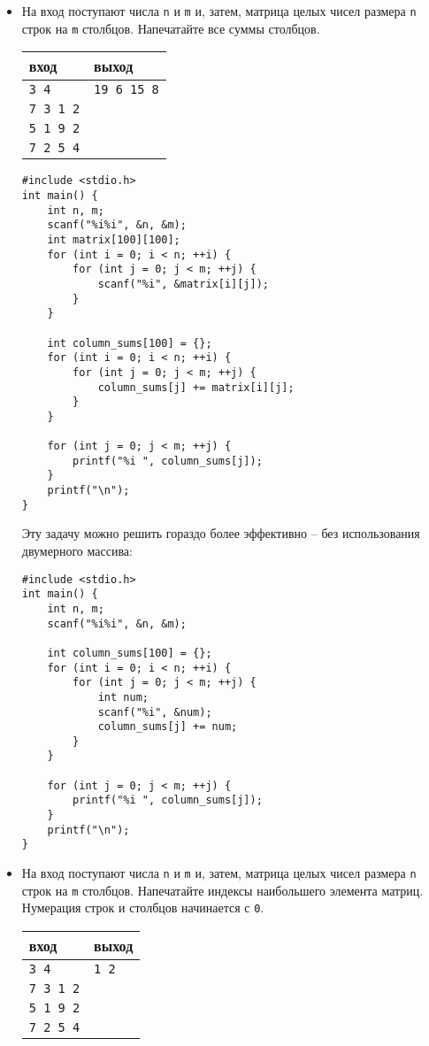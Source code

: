 \documentclass{article}
\begin{document}
\begin{itemize}
\item На вход поступают числа \texttt{n} и \texttt{m} и, затем, матрица целых чисел размера \texttt{n} строк на \texttt{m} столбцов. Напечатайте все суммы столбцов.
\begin{center}
\begin{tabular}{ l | l }
 вход & выход \\ \hline
 \texttt{3 4} & \texttt{19 6 15 8}  \\ 
 \texttt{7 3 1 2} &  \\ 
 \texttt{5 1 9 2} &  \\ 
 \texttt{7 2 5 4} &  \\ 
\end{tabular}
\end{center}

\begin{lstlisting}[backgroundcolor = \color{solcolor}]
#include <stdio.h>
int main() {
    int n, m;
    scanf("%i%i", &n, &m);
    int matrix[100][100];
    for (int i = 0; i < n; ++i) {
        for (int j = 0; j < m; ++j) {
            scanf("%i", &matrix[i][j]);
        }
    }
    
    int column_sums[100] = {};
    for (int i = 0; i < n; ++i) {
        for (int j = 0; j < m; ++j) {
            column_sums[j] += matrix[i][j];
        }
    }
    
    for (int j = 0; j < m; ++j) {
        printf("%i ", column_sums[j]);
    }
    printf("\n");
}
\end{lstlisting}
Эту задачу можно решить гораздо более эффективно -- без использования двумерного массива:
\begin{lstlisting}[backgroundcolor = \color{solcolor}]
#include <stdio.h>
int main() {
    int n, m;
    scanf("%i%i", &n, &m);
    
    int column_sums[100] = {};
    for (int i = 0; i < n; ++i) {
        for (int j = 0; j < m; ++j) {
            int num;
            scanf("%i", &num);
            column_sums[j] += num;
        }
    }
 
    for (int j = 0; j < m; ++j) {
        printf("%i ", column_sums[j]);
    }
    printf("\n");
}
\end{lstlisting}


\item На вход поступают числа \texttt{n} и \texttt{m} и, затем, матрица целых чисел размера \texttt{n} строк на \texttt{m} столбцов. Напечатайте индексы наибольшего элемента матриц. Нумерация строк и столбцов начинается с \texttt{0}.
\begin{center}
\begin{tabular}{ l | l }
 вход & выход \\ \hline
 \texttt{3 4} & \texttt{1 2}  \\ 
 \texttt{7 3 1 2} &  \\ 
 \texttt{5 1 9 2} &  \\ 
 \texttt{7 2 5 4} &  \\ 
\end{tabular}
\end{center}


\end{itemize}
\end{document}
